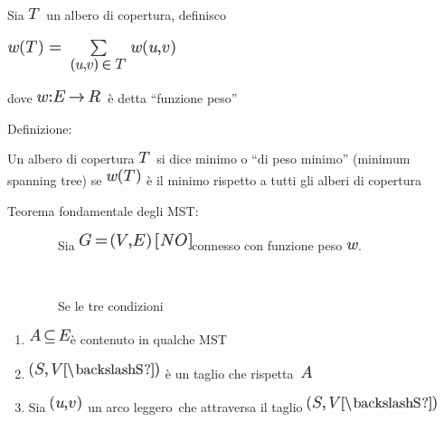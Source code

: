 \documentclass{article}
\providecommand{\tightlist}{%
  \setlength{\itemsep}{0pt}\setlength{\parskip}{0pt}}
\begin{document}
{Sia }\includegraphics{images/image37.png}{~un albero di copertura,
definisco}

\includegraphics{images/image446.png}

{dove }\includegraphics{images/image447.png}{~è detta ``funzione peso''
}

{}

{Definizione}{:}

{Un albero di copertura }\includegraphics{images/image37.png}{~si dice
minimo o ``di peso minimo'' (minimum spanning tree) se
}\includegraphics{images/image448.png}{~è il minimo rispetto a tutti gli
alberi di copertura}

{}

{Teorema fondamentale degli MST}{:}

{~~~~~~~~Sia }\includegraphics{images/image420.png}{connesso con
funzione peso }\includegraphics{images/image224.png}{.}

{~~~~~~~~}

{~~~~~~~~Se le tre condizioni}

\begin{enumerate}
\tightlist
\item
  \includegraphics{images/image445.png}{è contenuto in qualche MST}
\item
  \includegraphics{images/image444.png}{~è un }{taglio }{che
  }{rispetta}{~}\includegraphics{images/image73.png}
\item
  {Sia }\includegraphics{images/image449.png}{~un arco }{leggero}{~che
  attraversa il taglio }\includegraphics{images/image444.png}
\end{enumerate}
\end{document}

